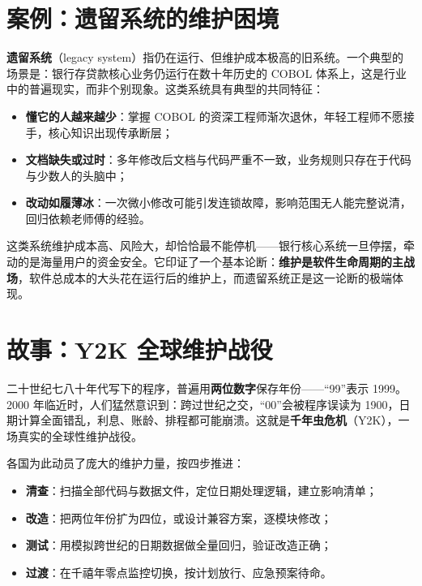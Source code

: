 \documentclass[12pt,a4paper,twoside,openany]{ctexbook}
\numberwithin{figure}{chapter}
\numberwithin{table}{chapter}
\providecommand{\tightlist}{\setlength{\itemsep}{0pt}\setlength{\parskip}{0pt}}
\begin{document}
\section{案例：遗留系统的维护困境}\label{ux6848ux4f8bux9057ux7559ux7cfbux7edfux7684ux7ef4ux62a4ux56f0ux5883}

\textbf{遗留系统}（legacy
system）指仍在运行、但维护成本极高的旧系统。一个典型的场景是：银行存贷款核心业务仍运行在数十年历史的
COBOL
体系上，这是行业中的普遍现实，而非个别现象。这类系统具有典型的共同特征：

\begin{itemize}
\tightlist
\item
  \textbf{懂它的人越来越少}：掌握 COBOL
  的资深工程师渐次退休，年轻工程师不愿接手，核心知识出现传承断层；
\item
  \textbf{文档缺失或过时}：多年修改后文档与代码严重不一致，业务规则只存在于代码与少数人的头脑中；
\item
  \textbf{改动如履薄冰}：一次微小修改可能引发连锁故障，影响范围无人能完整说清，回归依赖老师傅的经验。
\end{itemize}

这类系统维护成本高、风险大，却恰恰最不能停机------银行核心系统一旦停摆，牵动的是海量用户的资金安全。它印证了一个基本论断：\textbf{维护是软件生命周期的主战场}，软件总成本的大头花在运行后的维护上，而遗留系统正是这一论断的极端体现。

\section{故事：Y2K
全球维护战役}\label{ux6545ux4e8by2k-ux5168ux7403ux7ef4ux62a4ux6218ux5f79}

二十世纪七八十年代写下的程序，普遍用\textbf{两位数字}保存年份------``99''表示
1999。2000 年临近时，人们猛然意识到：跨过世纪之交，``00''会被程序误读为
1900，日期计算全面错乱，利息、账龄、排程都可能崩溃。这就是\textbf{千年虫危机}（Y2K），一场真实的全球性维护战役。

各国为此动员了庞大的维护力量，按四步推进：

\begin{itemize}
\tightlist
\item
  \textbf{清查}：扫描全部代码与数据文件，定位日期处理逻辑，建立影响清单；
\item
  \textbf{改造}：把两位年份扩为四位，或设计兼容方案，逐模块修改；
\item
  \textbf{测试}：用模拟跨世纪的日期数据做全量回归，验证改造正确；
\item
  \textbf{过渡}：在千禧年零点监控切换，按计划放行、应急预案待命。
\end{itemize}
\end{document}
